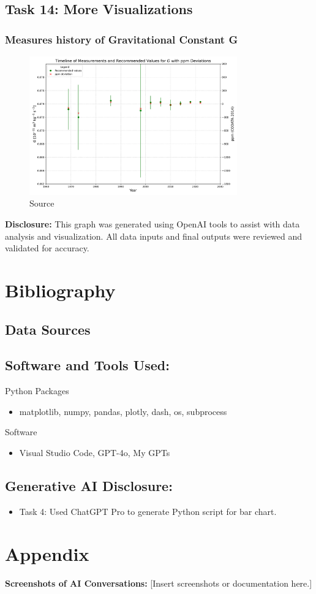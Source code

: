\documentclass[a4paper,landscape]{article}
\begin{document}
\subsection{Task 14: More Visualizations}
\subsubsection{Measures history of Gravitational Constant G}

\begin{figure}[H]
    \centering
    \includegraphics[width=0.8\textwidth]{gravitational_constant.pdf} %
    \caption{Source \cite{wikipedia2025gconst}}
    \label{fig:G}
\end{figure}


\textbf{Disclosure:} This graph was generated using OpenAI tools to assist with data analysis and visualization. All data inputs and final outputs were reviewed and validated for accuracy.

\section{Bibliography}


\subsection{Data Sources}

\subsection{Software and Tools Used:}
Python Packages
\begin{itemize}
    \item matplotlib, numpy, pandas, plotly, dash, os, subprocess
\end{itemize}
Software
\begin{itemize}
    \item Visual Studio Code, GPT-4o, My GPTs
\end{itemize}

\subsection{Generative AI Disclosure:}
\begin{itemize}
    \item Task 4: Used ChatGPT Pro to generate Python script for bar chart.
\end{itemize}

\section{Appendix}
\textbf{Screenshots of AI Conversations:}
[Insert screenshots or documentation here.]
\end{document}
